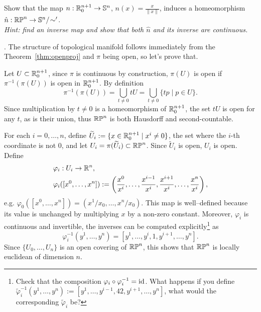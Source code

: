 \begin{example}
	\begin{exercise}\label{exe:RPSN}
		Show that the map $n: \mathbb{R}^{n+1}_0\to \mathbb{S}^n$, $n(x) = \frac{x}{\|x\|}$, induces a homeomorphism $\hat n:\mathbb{RP}^n \to \mathbb{S}^n/\!\sim'$.\\
		\textit{\small Hint: find an inverse map and show that both $\hat n$ and its inverse are continuous.}
	\end{exercise}

	.
	The structure of topological manifold follows immediately from the Theorem~\ref{thm:openproj} and $\pi$ being open, so let's prove that.

	Let $U\subset\mathbb{R}_0^{n+1}$, since $\pi$ is continuous by construction, $\pi(U)$ is open if $\pi^{-1}(\pi(U))$ is open in $\mathbb{R}^{n+1}_0$.
	By definition
	\begin{equation}
		\pi^{-1}(\pi(U)) = \bigcup_{t\neq 0} tU = \bigcup_{t\neq 0}\{tp \mid p\in U\}.
	\end{equation}
	Since multiplication by $t\neq 0$ is a homeomorphism of $\mathbb{R}_0^{n+1}$, the set $t U$ is open for any $t$, as is their union, thus $\mathbb{RP}^n$ is both Hausdorff and second-countable.

	For each $i=0,\ldots,n$, define $\widetilde U_i := \{x\in\mathbb{R}^{n+1}_0 \mid x^i\neq0\}$, the set where the $i$-th coordinate is not $0$, and let $U_i = \pi(\widetilde U_i)\subset \mathbb{RP}^n$.
	Since $\widetilde U_i$ is open, $U_i$ is open.
	Define
	\begin{align}
		 & \varphi_i:U_i\to\mathbb{R}^n,                                                                                                               \\
		 & \varphi_i([x^0, \ldots, x^n]):= \left(\frac{x^0}{x^i},\ldots,\frac{x^{i-1}}{x^i},\frac{x^{i+1}}{x^i},\ldots,\frac{x^n}{x^i}\right),
	\end{align}
	e.g. $\varphi_0([x^0, \ldots, x^n]) = (x^1/x_0, \ldots, x^n/x_0)$.
	This map is well--defined because its value is unchanged by multiplying $x$ by a non-zero constant.
	Moreover, $\varphi_i$ is continuous and invertible, the inverses can be computed explicitly\footnote{Check that the composition $\varphi_i \circ \varphi_i^{-1} = \operatorname{id}$. What happens if you define $\widetilde\varphi^{-1}_i(y^1, \ldots, y^n) := \left[y^1, \ldots, y^{i-1}, 42, y^{i+1}, \ldots, y^n\right]$, what would the corresponding $\widetilde\varphi_i$ be?} as
	\begin{equation}
		\varphi_i^{-1}(y^1,\ldots,y^n) = \left[y^1, \ldots, y^{i}, 1, y^{i+1}, \ldots, y^n\right].
	\end{equation}
	Since $\{U_0, \ldots, U_n\}$ is an open covering of $\mathbb{RP}^n$, this shows that $\mathbb{RP}^n$ is locally euclidean of dimension $n$.


\end{example}

